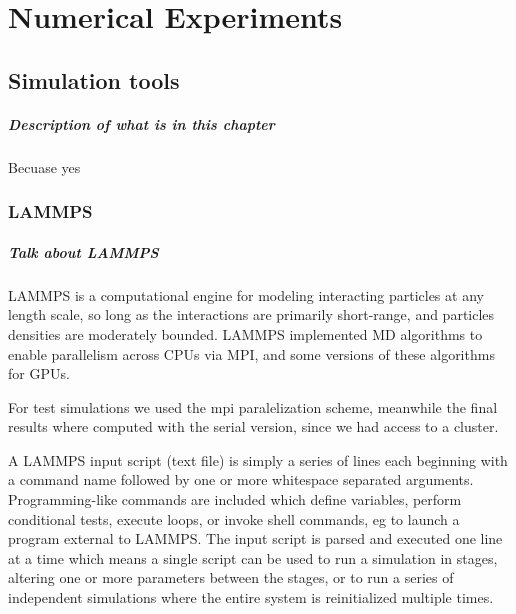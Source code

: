 


\chapter{Numerical Experiments}\label{ch3:NumExp}


\section{Simulation tools}

\paragraph{Description of what is in this chapter} Becuase yes

\subsection{LAMMPS}

\paragraph{Talk about LAMMPS} LAMMPS is a computational engine for modeling interacting particles at any length scale, so long as the interactions are primarily short-range, and particles densities are moderately bounded\citep{thompsonLAMMPSFlexibleSimulation2022}.
LAMMPS implemented MD algorithms to enable parallelism across CPUs via MPI, and some versions of these algorithms for GPUs.

For test simulations we used the mpi paralelization scheme, meanwhile the final results where computed with the serial version, since we had access to a cluster.

A LAMMPS input script (text file) is simply a series of lines each beginning with a command name followed by one or more whitespace separated arguments. 
Programming-like commands are included which define variables, perform conditional tests, execute loops, or invoke shell commands, eg to launch a program external to LAMMPS. 
The input script is parsed and executed one line at a time which means a single script can be used to run a simulation in stages, altering one or more parameters between the stages, or to run a series of independent simulations where the entire system is reinitialized multiple times.

